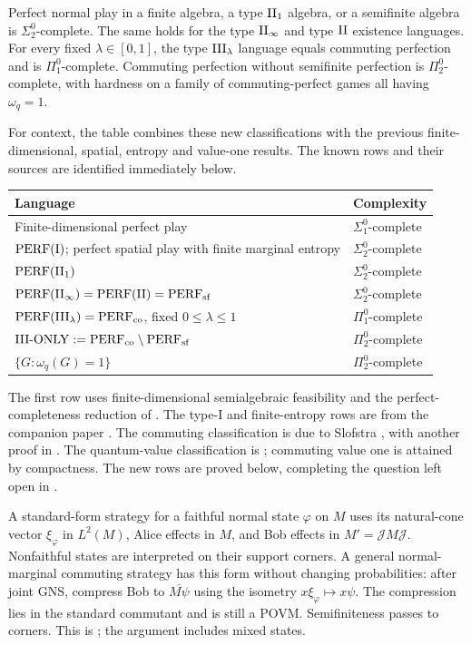 \begin{theoremA}
Perfect normal play in a finite algebra, a type $\mathrm{II}_1$ algebra,
or a semifinite algebra is $\Sigma^0_2$-complete. The same holds
for the type $\mathrm{II}_\infty$ and type $\mathrm{II}$ existence languages.
For every fixed $\lambda\in[0,1]$, the type $\mathrm{III}_\lambda$ language
equals commuting perfection and is $\Pi^0_1$-complete.
Commuting perfection without semifinite perfection is
$\Pi^0_2$-complete, with hardness on a family of commuting-perfect
games all having $\omega_q=1$.
\end{theoremA}
For context, the table combines these new classifications with the
previous finite-dimensional, spatial, entropy and value-one results.
The known rows and their sources are identified immediately below.
\begin{center}\small
\begin{tabular}{@{}p{.57\linewidth}p{.32\linewidth}@{}}
\toprule Language & Complexity\\\midrule
Finite-dimensional perfect play & $\Sigma^0_1$-complete\\
$\mathrm{PERF}(\mathrm I)$; perfect spatial play with finite marginal entropy
& $\Sigma^0_2$-complete\\
$\mathrm{PERF}(\mathrm{II}_1)$ & $\Sigma^0_2$-complete\\
$\mathrm{PERF}(\mathrm{II}_\infty)=\mathrm{PERF}(\mathrm{II})=\mathrm{PERF}_{\mathrm{sf}}$ & $\Sigma^0_2$-complete\\
$\mathrm{PERF}(\mathrm{III}_\lambda)=\mathrm{PERF}_{\mathrm{co}}$, fixed $0\leq\lambda\leq1$
& $\Pi^0_1$-complete\\
$\mathrm{III}\text{-}\mathrm{ONLY}:=\mathrm{PERF}_{\mathrm{co}}\setminus\mathrm{PERF}_{\mathrm{sf}}$
& $\Pi^0_2$-complete\\
$\{G:\omega_q(G)=1\}$ & $\Pi^0_2$-complete\\
\bottomrule
\end{tabular}
\end{center}
The first row uses finite-dimensional semialgebraic feasibility and the
perfect-completeness reduction of \cite[Theorem 12.6]{MIPRE}.
The type-I and finite-entropy rows are from the companion paper
\cite{Spatial}. The commuting classification is due to Slofstra
\cite{Slofstra}, with another proof in \cite[Theorem 6.4]{MNY}.
The quantum-value classification is \cite[Theorem 6.9]{MNY};
commuting value one is attained by compactness. The new rows are proved below, completing the question
left open in \cite[Theorem 7.6]{ReadType}.

A standard-form strategy for a faithful normal state $\varphi$ on $M$
uses its natural-cone vector $\xi_\varphi$ in $L^2(M)$, Alice effects in
$M$, and Bob effects in $M'=\mathcal JM\mathcal J$. Nonfaithful states are interpreted on
their support corners. A general normal-marginal commuting strategy has
this form without changing probabilities: after joint GNS, compress Bob
to $\overline{M\psi}$ using the isometry $x\xi_\varphi\mapsto x\psi$.
The compression lies in the standard commutant and is still a POVM.
Semifiniteness passes to corners. This is
\cite[Lemma 1.6]{ReadType}; the argument includes mixed states.

